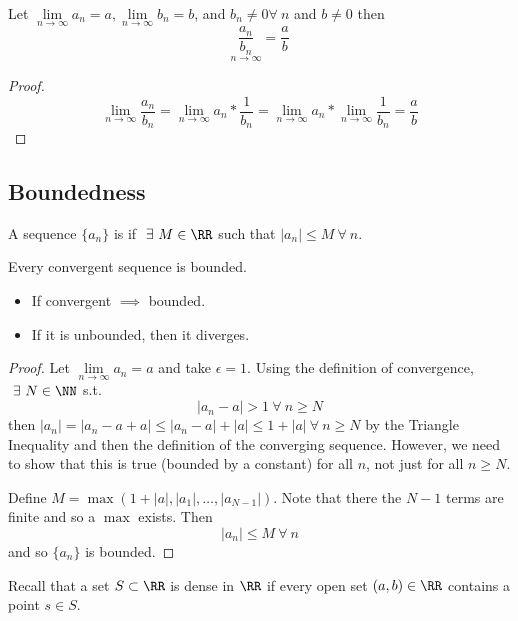 \documentclass[12pt]{scrartcl}
\begin{document}
\begin{theorem}
  Let $\underset{n\to\infty}{\lim}a_n = a, \underset{n\to\infty}{\lim}b_n = b$, and $b_n \neq 0 \forall \ n$ and 
  $b \neq 0$ then 
  \[\underset{n\to\infty}{\frac{a_n}{b_n}} = \frac{a}{b}\]
  \begin{proof}
    \[\lim_{n\to\infty}\frac{a_n}{b_n} = \lim_{n\to\infty}a_n * \frac{1}{b_n} = \lim_{n\to\infty}a_n * \lim_{n\to\infty}\frac{1}{b_n} = \frac{a}{b}\]
  \end{proof}
\end{theorem}

\subsection{Boundedness}

\begin{definition}
  A sequence $\{a_n\}$ is  if $\ \exists \ M \in \RR$ such that $|a_n| \leq M \ \forall \ n$.  
\end{definition}

\begin{theorem}
  Every convergent sequence is bounded. 
  \begin{itemize}
    \item If convergent $\implies$ bounded.
    \item If it is unbounded, then it diverges. 
  \end{itemize}
  
  \begin{proof}
      Let $\underset{n\to\infty}{\lim}a_n = a$ and take $\epsilon = 1$. Using the definition of 
      convergence, $\ \exists \ N \in \NN$ s.t. 
      \[|a_n - a| > 1 \ \forall \ n \geq N\]
      then $|a_n| = |a_n - a + a| \leq |a_n - a| + |a| \leq 1 + |a| \ \forall \ n \geq N$ by the 
      Triangle Inequality and then the definition of the converging sequence. However, we need
      to show that this is true (bounded by a constant) for all $n$, not just for all $n \geq N$. 

      \hfill

      Define $M = \max(1 + |a|, |a_1|, \ldots, |a_{N-1}|)$. Note that there the $N-1$ terms are finite 
      and so a $\max$ exists. Then 
      \[|a_n| \leq M \ \forall \ n\]
      and so $\{a_n\}$ is bounded.
  \end{proof}
\end{theorem}

\begin{remark}
  Recall that a set $S \subset \RR$ is dense in $\RR$ if every open set $(a, b) \in \RR$ contains a 
  point $s \in S$.
\end{remark}
\end{document}

